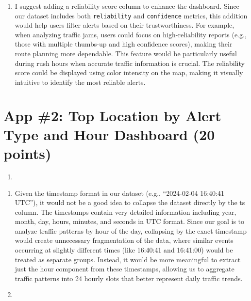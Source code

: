 \documentclass[
  letterpaper,
  DIV=11,
  numbers=noendperiod]{scrartcl}
\providecommand{\tightlist}{%
  \setlength{\itemsep}{0pt}\setlength{\parskip}{0pt}}\usepackage{longtable,booktabs,array}
\begin{document}
\begin{enumerate}
\def\labelenumi{\alph{enumi}.}
\setcounter{enumi}{4}
\tightlist
\item
  I suggest adding a reliability score column to enhance the dashboard.
  Since our dataset includes both \texttt{reliability} and
  \texttt{confidence} metrics, this addition would help users filter
  alerts based on their trustworthiness. For example, when analyzing
  traffic jams, users could focus on high-reliability reports (e.g.,
  those with multiple thumbs-up and high confidence scores), making
  their route planning more dependable. This feature would be
  particularly useful during rush hours when accurate traffic
  information is crucial. The reliability score could be displayed using
  color intensity on the map, making it visually intuitive to identify
  the most reliable alerts.
\end{enumerate}

\section*{App \#2: Top Location by Alert Type and Hour Dashboard (20
points)}\label{app-2-top-location-by-alert-type-and-hour-dashboard-20-points}

\begin{enumerate}
\def\labelenumi{\arabic{enumi}.}
\tightlist
\item
\end{enumerate}

\begin{enumerate}
\def\labelenumi{\alph{enumi}.}
\item
  Given the timestamp format in our dataset (e.g., ``2024-02-04 16:40:41
  UTC''), it would not be a good idea to collapse the dataset directly
  by the ts column. The timestamps contain very detailed information
  including year, month, day, hours, minutes, and seconds in UTC format.
  Since our goal is to analyze traffic patterns by hour of the day,
  collapsing by the exact timestamp would create unnecessary
  fragmentation of the data, where similar events occurring at slightly
  different times (like 16:40:41 and 16:41:00) would be treated as
  separate groups. Instead, it would be more meaningful to extract just
  the hour component from these timestamps, allowing us to aggregate
  traffic patterns into 24 hourly slots that better represent daily
  traffic trends.
\item
\end{enumerate}
\end{document}
